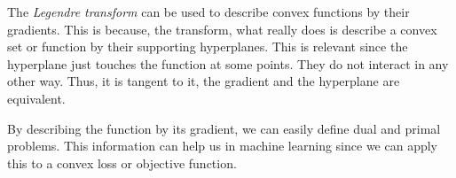 \documentclass[]{article}
\theoremstyle{definition}
\begin{document}
The \textit{Legendre transform} can be used to describe convex functions by their gradients. This is because, the transform, what really does is describe a convex set or function by their supporting hyperplanes. This is relevant since the hyperplane just touches the function at some points. They do not interact in any other way. Thus, it is tangent to it, the gradient and the hyperplane are equivalent. 

By describing the function by its gradient, we can easily define dual and primal problems. This information can help us in machine learning since we can apply this to a convex loss or objective function.  
\end{document}
